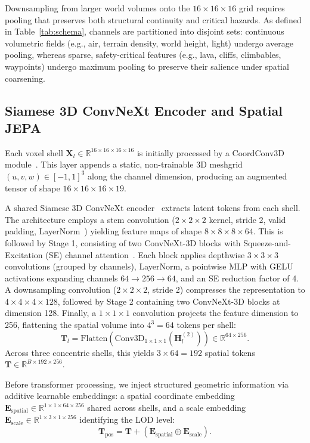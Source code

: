 \documentclass{svproc}
\begin{document}
Downsampling from larger world volumes onto the $16 \times 16 \times 16$ grid requires pooling that preserves both structural continuity and critical hazards. As defined in Table~\ref{tab:schema}, channels are partitioned into disjoint sets: continuous volumetric fields (e.g., air, terrain density, world height, light) undergo average pooling, whereas sparse, safety-critical features (e.g., lava, cliffs, climbables, waypoints) undergo maximum pooling to preserve their salience under spatial coarsening.

\subsection{Siamese 3D ConvNeXt Encoder and Spatial JEPA}
Each voxel shell $\mathbf{X}_l \in \mathbb{R}^{16 \times 16 \times 16 \times 16}$ is initially processed by a CoordConv3D module~\cite{liu2018coordconv}. This layer appends a static, non-trainable 3D meshgrid $(u, v, w) \in [-1, 1]^3$ along the channel dimension, producing an augmented tensor of shape $16 \times 16 \times 16 \times 19$. 

A shared Siamese 3D ConvNeXt encoder~\cite{liu2022convnet} extracts latent tokens from each shell. The architecture employs a stem convolution ($2\times2\times2$ kernel, stride 2, valid padding, LayerNorm~\cite{ba2016layernorm}) yielding feature maps of shape $8\times8\times8\times64$. This is followed by Stage 1, consisting of two ConvNeXt-3D blocks with Squeeze-and-Excitation (SE) channel attention~\cite{hu2018squeeze}. Each block applies depthwise $3\times3\times3$ convolutions (grouped by channels), LayerNorm, a pointwise MLP with GELU activations expanding channels $64 \to 256 \to 64$, and an SE reduction factor of 4. A downsampling convolution ($2\times2\times2$, stride 2) compresses the representation to $4\times4\times4\times128$, followed by Stage 2 containing two ConvNeXt-3D blocks at dimension 128. Finally, a $1\times1\times1$ convolution projects the feature dimension to 256, flattening the spatial volume into $4^3 = 64$ tokens per shell:
\begin{equation}
\mathbf{T}_l = \mathrm{Flatten}\left(\mathrm{Conv3D}_{1\times1\times1}\left(\mathbf{H}_l^{(2)}\right)\right) \in \mathbb{R}^{64 \times 256}.
\end{equation}
Across three concentric shells, this yields $3 \times 64 = 192$ spatial tokens $\mathbf{T} \in \mathbb{R}^{B \times 192 \times 256}$.

Before transformer processing, we inject structured geometric information via additive learnable embeddings: a spatial coordinate embedding $\mathbf{E}_{\text{spatial}} \in \mathbb{R}^{1 \times 1 \times 64 \times 256}$ shared across shells, and a scale embedding $\mathbf{E}_{\text{scale}} \in \mathbb{R}^{1 \times 3 \times 1 \times 256}$ identifying the LOD level:
\begin{equation}
\mathbf{T}_{\text{pos}} = \mathbf{T} + \left(\mathbf{E}_{\text{spatial}} \oplus \mathbf{E}_{\text{scale}}\right).
\end{equation}
\end{document}
